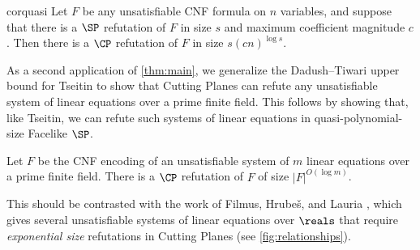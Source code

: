 \documentclass{toc}
\begin{document}
\begin{restatable}{cor}{quasi}
	\label{cor:quasipoly-simulation}
	Let $F$ be any unsatisfiable CNF formula on $n$ variables, and suppose that there is a $\SP$ refutation of $F$ in size $s$ and maximum coefficient magnitude $c$. 
	Then there is a $\CP$ refutation of $F$ in size $s(cn)^{\log s}$.
\end{restatable}


As a second application of \autoref{thm:main}, we generalize %
the Dadush--Tiwari  %
%
upper bound for Tseitin to show that Cutting Planes can refute any unsatisfiable system of linear equations over a prime finite field. 
This follows by showing that, like Tseitin, we can refute such systems of linear equations in quasi-polynomial-size Facelike $\SP$.
\begin{theorem}\label{thm:linear-equations}
	Let $F$ be the CNF encoding of an unsatisfiable system of $m$ linear equations over a prime finite field. 
	There is a $\CP$ refutation of $F$ of size $|F|^{O(\log m)}$. 
\end{theorem}

This should be contrasted with the work of Filmus, Hrube\v{s}, and Lauria \cite{FilmusHL16}, which gives several unsatisfiable systems of linear equations over $\reals$ that require \emph{exponential size} refutations in Cutting Planes (see \autoref{fig:relationships}).
\end{document}
